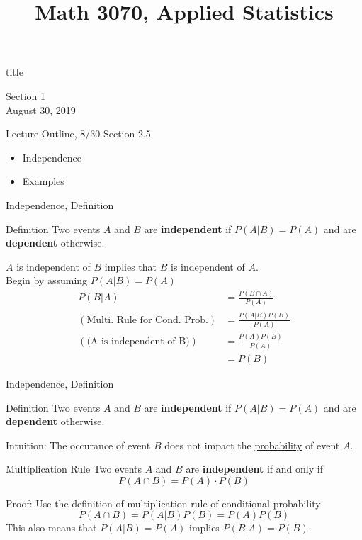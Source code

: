 \documentclass[handout]{beamer}
\title{Math 3070, Applied Statistics}
\newcommand{\nl}[1]{\vspace{#1 em}}
\begin{document}
\begin{frame}
    \begin{beamercolorbox}[rounded=true,wd=\textwidth,center]{title}
        \inserttitle
    \end{beamercolorbox}
    \begin{center}
        Section 1\\
        \nl{0.5}
        August 30, 2019
    \end{center}

\end{frame}

\begin{frame}{Lecture Outline, 8/30}
    Section 2.5
    \begin{itemize}
        \item Independence
        \item Examples
    \end{itemize}
\end{frame}

\begin{frame}{Independence, Definition}
    \begin{block}{Definition}
        Two events $A$ and $B$ are \textbf{independent} if $P(A|B) = P(A)$ and are \textbf{dependent} otherwise.
    \end{block}
    \pause $A$ is independent of $B$ implies that $B$ is independent of $A$.\\
    Begin by assuming $P(A|B) = P(A)$
    \begin{align*}
        P(B|A) & = \frac{P(B \cap A)}{P(A)} \\
        (\text{Multi. Rule for Cond. Prob.}) & = \frac{P(A|B) P(B)}{P(A)}\\
        (\text{(A is independent of B)})& = \frac{P(A) P(B)}{P(A)}\\
        & = P(B)
    \end{align*}
\end{frame}

\begin{frame}{Independence, Definition}
    \begin{block}{Definition}
        Two events $A$ and $B$ are \textbf{independent} if $P(A|B) = P(A)$ and are \textbf{dependent} otherwise.
    \end{block}
    \pause Intuition: The occurance of event $B$ does not impact the \underline{probability} of event $A$.
    \pause \begin{block}{Multiplication Rule}
        Two events $A$ and $B$ are \textbf{independent} if and only if
        $$P(A\cap B) = P(A)\cdot P(B)$$
    \end{block}
    Proof: Use the definition of multiplication rule of conditional probability
    $$P(A\cap B) = P(A|B)P(B) = P(A)P(B)$$
    \pause This also means that $P(A|B) = P(A)$ implies $P(B|A) = P(B)$.
\end{frame}
\end{document}
